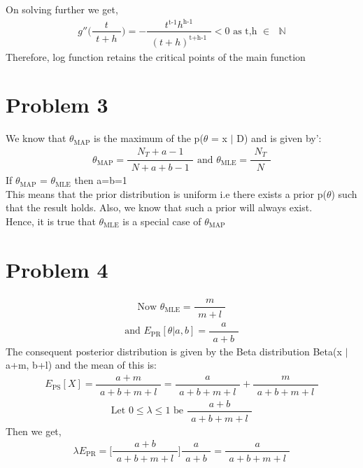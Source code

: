 \documentclass[11pt, a4paper, fleqn]{article}
\begin{document}
On solving further we get,
\begin{equation}
g''\Big(\frac{\substack{t}}{\substack{t+h}}\Big)=
- \frac{\substack{t^\text{t-1} h^\text{h-1}}}{\substack{(t+h)^\text{t+h-1}}} < 0 \text{  as t,h $\in$ $\mathbb{N}$}
\end{equation}
Therefore, log function retains the critical points of the main function

\section{Problem 3}
We know that $\theta_\text{MAP}$ is the maximum of the p($\theta$ = x $|$ D) and is given by':
\begin{equation*}
\theta_\text{MAP} =  \frac{\substack{N_T + a -1}}{\substack{N + a+b-1}} 
\text{   and   } 
\theta_\text{MLE} =  \frac{\substack{N_T}}{\substack{N}}
\end{equation*}
If $\theta_\text{MAP}$ = $\theta_\text{MLE}$ then a=b=1\\
This means that the prior distribution is uniform i.e there exists a prior p($\theta$) such that the result holds. Also, we know that such a prior will always exist.
\\Hence, it is true that $\theta_\text{MLE}$ is a special case of $\theta_\text{MAP}$

\section{Problem 4}
\begin{equation*}
\text{Now } \theta_\text{MLE} =  \frac{\substack{m}}{\substack{m+l}}
\end{equation*}
\begin{equation*}
\text{and } E_\text{PR}[\theta|a,b] =  \frac{\substack{a}}{\substack{a+b}}
\end{equation*}
The consequent posterior distribution is given by the Beta distribution Beta(x $|$ a+m, b+l) and the mean of this is:
\begin{equation*}
E_\text{PS}[X] =  \frac{\substack{a+m}}{\substack{a+b+m+l}} = 
\frac{\substack{a}}{\substack{a+b+m+l}} + \frac{\substack{m}}{\substack{a+b+m+l}}
\end{equation*}
\begin{equation*}
\text{Let   } 0 \leq \lambda \leq 1 \text{   be   }
\frac{\substack{a+b}}{\substack{a+b+m+l}}
\end{equation*}
Then we get, 
\begin{equation}
\lambda E_\text{PR} = \Big[\frac{\substack{a+b}}{\substack{a+b+m+l}}\Big]  \frac{\substack{a}}{\substack{a+b}} 
= \frac{\substack{a}}{\substack{a+b+m+l}}
\end{equation}
\end{document}
